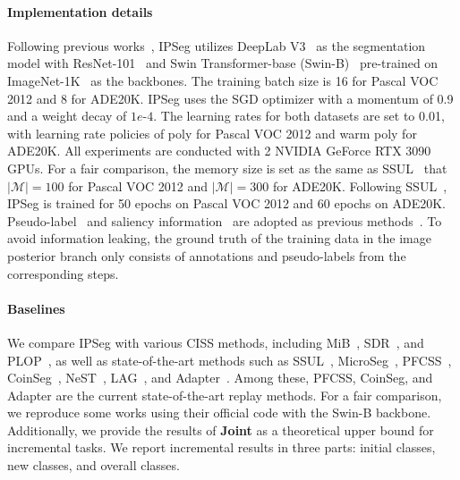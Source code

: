 \paragraph{Implementation details}
Following previous works~\citep{sppa_lin2022continual,DKD_baek2022decomposed,ewf_xiao2023endpoints}, IPSeg utilizes DeepLab V3~\citep{deeplab_v3_chen2017rethinking} as the segmentation model with ResNet-101~\citep{resnet_he2016deep} and Swin Transformer-base (Swin-B)~\citep{swin_liu2021swin} pre-trained on ImageNet-1K~\citep{imagenet_1k_deng2009imagenet} as the backbones. The training batch size is 16 for Pascal VOC 2012 and 8 for ADE20K. IPSeg uses the SGD optimizer with a momentum of 0.9 and a weight decay of $1e$-$4$. The learning rates for both datasets are set to 0.01, with learning rate policies of poly for Pascal VOC 2012 and warm poly for ADE20K. All experiments are conducted with 2 NVIDIA GeForce RTX 3090 GPUs. For a fair comparison, the memory size is set as the same as SSUL~\citep{SSUL_cha2021ssul} that \(|\mathcal{M}|=100\) for Pascal VOC 2012 and \(|\mathcal{M}|=300\) for ADE20K.
Following SSUL~\citep{SSUL_cha2021ssul}, IPSeg is trained for 50 epochs on Pascal VOC 2012 and 60 epochs on ADE20K.
Pseudo-label~\citep{coinseg_zhang2023coinseg} and saliency information~\citep{SOD_deep_used_hou2017deeply} are adopted as previous methods~\citep{SSUL_cha2021ssul, microseg_zhang2022mining}. To avoid information leaking, the ground truth of the training data in the image posterior branch only consists of annotations and pseudo-labels from the corresponding steps.

\paragraph{Baselines} We compare IPSeg with various CISS methods, including MiB~\citep{MiB_cermelli2020modeling}, SDR~\citep{sdr_michieli2021continual}, and PLOP~\citep{PLOP_douillard2021plop}, as well as state-of-the-art methods such as SSUL~\citep{SSUL_cha2021ssul}, MicroSeg~\citep{microseg_zhang2022mining}, PFCSS~\citep{PFCSS_lin2023preparing}, CoinSeg~\citep{coinseg_zhang2023coinseg}, NeST~\citep{nest_xie2024early}, LAG~\citep{lag_yuan2024learning}, and Adapter~\citep{adapter_zhu2024adaptive}. Among these, PFCSS, CoinSeg, and Adapter are the current state-of-the-art replay methods. For a fair comparison, we reproduce some works using their official code with the Swin-B backbone. Additionally, we provide the results of \textbf{Joint} as a theoretical upper bound for incremental tasks. We report incremental results in three parts: initial classes, new classes, and overall classes.


